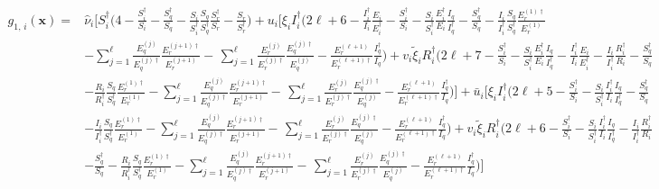 \documentclass[a4paper]{article}
\newcommand{\dsum}{\displaystyle\sum}
\begin{document}
\begin{align}
g_{1,\,i}(\mathbf x)= &\hat\nu_i\Bigg[ S_i^\dagger  \Big(4-\frac{S^\dagger _i}{S_i}-\frac{S^\dagger _q}{S_q}-\frac{S_i}{S^\dagger _i}\frac{S_q}{S^\dagger _q}\frac{S^\dagger _r}{S_r}-\frac{S_r}{S^\dagger _r}\Big) + u_i\Big[\xi_i I^\dagger _i\Big(2\ell+6 - \frac{I^\dagger_i}{I_i}\frac{E_i}{E^\dagger_i}-\frac{S^\dagger _i}{S_i}-\frac{S_i}{S^\dagger _i}\frac{E^\dagger _i}{E_i}\frac{I_q}{I^\dagger _q} -\frac{S^\dagger _q}{S_q} - \frac{I_i}{I^\dagger _i}\frac{S_q}{S^\dagger _q}\frac{E^{(1)\dagger }_r}{E^{(1)}_r}\nonumber\\&- {\dsum_{j=1}^{\ell}}\frac{E^{(j)}_q}{E^{(j)\dagger }_q}\frac{E^{(j+1)\dagger }_r}{E^{(j+1)}_r}-\, {\dsum_{j=1}^{\ell}}\frac{ E^{(j)}_r}{ E^{(j)\dagger }_r}\frac{E^{(j)\dagger }_q}{E^{(j)}_q} -\frac{E^{(\ell+1)}_r}{E^{(\ell+1)\dagger }_r}\frac{I^\dagger _q}{I_q} \Big) + v_i\widetilde\xi_iR^\dagger_i\Big(2\ell+7 - \frac{S^\dagger _i}{S_i}-\frac{S_i}{S^\dagger _i}\frac{E^\dagger _i}{E_i}\frac{I_q}{I^\dagger _q}  - \frac{I^\dagger_i}{I_i}\frac{E_i}{E^\dagger_i}  - \frac{I_i}{I^\dagger_i}\frac{R^\dagger_i}{R_i} - \frac{S^\dagger _q}{S_q} \nonumber\\&- \frac{R_i}{R^\dagger _i}\frac{S_q}{S^\dagger _q}\frac{E^{(1)\dagger }_r}{E^{(1)}_r}- {\dsum_{j=1}^{\ell}}\frac{E^{(j)}_q}{E^{(j)\dagger }_q}\frac{E^{(j+1)\dagger }_r}{E^{(j+1)}_r}-\, {\dsum_{j=1}^{\ell}}\frac{ E^{(j)}_r}{ E^{(j)\dagger }_r}\frac{E^{(j)\dagger }_q}{E^{(j)}_q} -\frac{E^{(\ell+1)}_r}{E^{(\ell+1)\dagger }_r}\frac{I^\dagger _q}{I_q} \Big)\Big] + \bar u_i\Big[\xi_i I^\dagger _i\Big(2\ell+5 - \frac{S^\dagger _i}{S_i}-\frac{S_i}{S^\dagger _i}\frac{I^\dagger _i}{I_i}\frac{I_q}{I^\dagger _q} -\frac{S^\dagger _q}{S_q} \nonumber\\&- \frac{I_i}{I^\dagger _i}\frac{S_q}{S^\dagger _q}\frac{E^{(1)\dagger }_r}{E^{(1)}_r}- {\dsum_{j=1}^{\ell}}\frac{E^{(j)}_q}{E^{(j)\dagger }_q}\frac{E^{(j+1)\dagger }_r}{E^{(j+1)}_r}-\, {\dsum_{j=1}^{\ell}}\frac{ E^{(j)}_r}{ E^{(j)\dagger }_r}\frac{E^{(j)\dagger }_q}{E^{(j)}_q} -\frac{E^{(\ell+1)}_r}{E^{(\ell+1)\dagger }_r}\frac{I^\dagger _q}{I_q} \Big) + v_i\widetilde\xi_iR^\dagger_i\Big(2\ell+6 - \frac{S^\dagger _i}{S_i}-\frac{S_i}{S^\dagger _i}\frac{I^\dagger _i}{I_i}\frac{I_q}{I^\dagger _q}  - \frac{I_i}{I^\dagger_i}\frac{R^\dagger_i}{R_i} \nonumber\\& - \frac{S^\dagger _q}{S_q}- \frac{R_i}{R^\dagger _i}\frac{S_q}{S^\dagger _q}\frac{E^{(1)\dagger }_r}{E^{(1)}_r}- {\dsum_{j=1}^{\ell}}\frac{E^{(j)}_q}{E^{(j)\dagger }_q}\frac{E^{(j+1)\dagger }_r}{E^{(j+1)}_r}-\, {\dsum_{j=1}^{\ell}}\frac{ E^{(j)}_r}{ E^{(j)\dagger }_r}\frac{E^{(j)\dagger }_q}{E^{(j)}_q} -\frac{E^{(\ell+1)}_r}{E^{(\ell+1)\dagger }_r}\frac{I^\dagger _q}{I_q} \Big)\Big]

\end{align}
\end{document}
